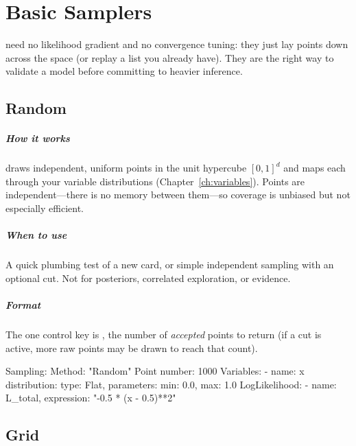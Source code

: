 \chapter{Basic Samplers}
\label{ch:basic-samplers}

 need no likelihood gradient and no convergence tuning: they just
lay points down across the space (or replay a list you already have). They are the right way to
validate a model before committing to heavier inference.

\section{Random}
\label{sec:s-random}

\paragraph{How it works}  draws independent, uniform points in the unit hypercube
$[0,1]^d$ and maps each through your variable distributions
(Chapter~\ref{ch:variables}). Points are independent---there is no memory between
them---so coverage is unbiased but not especially efficient.

\paragraph{When to use} A quick plumbing test of a new card, or simple independent sampling with
an optional  cut. Not for posteriors, correlated exploration, or evidence.

\paragraph{Format} The one control key is , the number of \emph{accepted}
points to return (if a  cut is active, more raw points may be drawn to reach
that count).

\begin{yamlwin}
Sampling:
  Method: "Random"
  Point number: 1000
  Variables:
    - name: x
      distribution: {type: Flat, parameters: {min: 0.0, max: 1.0}}
  LogLikelihood:
    - {name: L_total, expression: "-0.5 * (x - 0.5)**2"}
\end{yamlwin}

\section{Grid}
\label{sec:s-grid}

